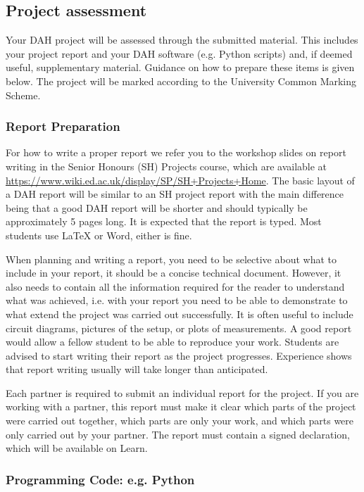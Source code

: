 \subsection{Project assessment}

Your DAH project will be assessed through the submitted material. This includes your project report and your DAH software (e.g. Python scripts) and, if deemed useful, supplementary material. Guidance on how to prepare these items is given below. The project will be marked according to the University Common Marking Scheme. 

\subsubsection{Report Preparation}

For how to write a proper report we refer you to the workshop slides on report writing in the Senior Honours  (SH) Projects course, which are available at
\url{https://www.wiki.ed.ac.uk/display/SP/SH+Projects+Home}.
The basic layout of a DAH report will be similar to an SH project report with the main difference being that a good DAH report will be shorter and should typically be approximately 5 pages long. It is expected that the report is typed. Most students use LaTeX or Word, either is fine.

When planning and writing a report, you need to be selective about what to include in your report, it should be a concise technical document. However, it also needs to contain all the information required for the reader to understand what was achieved, i.e. with your report you need to be able to demonstrate to what extend the project was carried out successfully. It is often useful to include circuit diagrams, pictures of the setup, or plots of measurements. A good report would allow a fellow student to be able to reproduce your work. Students are advised to start writing their report as the project progresses. Experience shows that report writing usually will take longer than anticipated.

Each partner is required to submit an individual report for the project. If you are working with a partner, this report must make it clear which parts of the project were carried out together, which parts are only your work, and which parts were only carried out by your partner. The report must contain a signed declaration, which will be available on Learn.

\subsubsection{Programming Code: e.g. Python}

